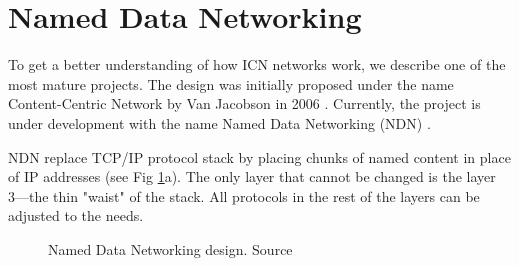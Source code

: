 \section{Named Data Networking}
\label{ndn}
To get a better understanding of how ICN networks work, we describe one of the most mature projects. The design was initially proposed under the name Content-Centric Network by Van Jacobson in 2006 \cite{4ANewWay38:online}. Currently, the project is under development with the name Named Data Networking (NDN) \cite{NamedDat22:online}. 

NDN replace TCP/IP protocol stack by placing chunks of named content in place of IP addresses (see Fig \ref{fig:ndn-design}a). The only layer that cannot be changed is the layer 3––the thin "waist" of the stack. All protocols in the rest of the layers can be adjusted to the needs.
\begin{figure}[h!]
 \hfill 	
\caption{Named Data Networking design. Source \cite{jacobson2009networking}}
\label{fig:ndn-design}
\end{figure}
